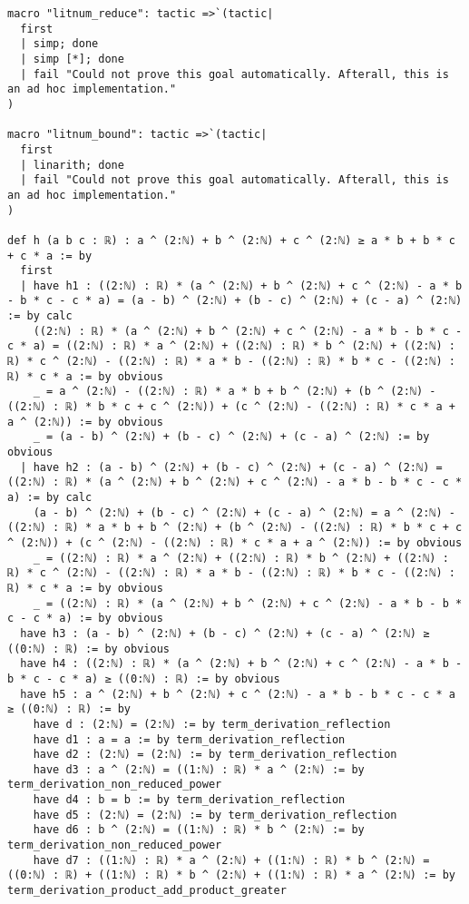 \documentclass{article}
\begin{document}
\begin{tcolorbox}[colback=white!10, width=\linewidth]
\begin{lstlisting}[language=Lean4]
macro "litnum_reduce": tactic =>`(tactic|
  first
  | simp; done
  | simp [*]; done
  | fail "Could not prove this goal automatically. Afterall, this is an ad hoc implementation."
)

macro "litnum_bound": tactic =>`(tactic|
  first
  | linarith; done
  | fail "Could not prove this goal automatically. Afterall, this is an ad hoc implementation."
)

def h (a b c : ℝ) : a ^ (2:ℕ) + b ^ (2:ℕ) + c ^ (2:ℕ) ≥ a * b + b * c + c * a := by
  first
  | have h1 : ((2:ℕ) : ℝ) * (a ^ (2:ℕ) + b ^ (2:ℕ) + c ^ (2:ℕ) - a * b - b * c - c * a) = (a - b) ^ (2:ℕ) + (b - c) ^ (2:ℕ) + (c - a) ^ (2:ℕ) := by calc
    ((2:ℕ) : ℝ) * (a ^ (2:ℕ) + b ^ (2:ℕ) + c ^ (2:ℕ) - a * b - b * c - c * a) = ((2:ℕ) : ℝ) * a ^ (2:ℕ) + ((2:ℕ) : ℝ) * b ^ (2:ℕ) + ((2:ℕ) : ℝ) * c ^ (2:ℕ) - ((2:ℕ) : ℝ) * a * b - ((2:ℕ) : ℝ) * b * c - ((2:ℕ) : ℝ) * c * a := by obvious
    _ = a ^ (2:ℕ) - ((2:ℕ) : ℝ) * a * b + b ^ (2:ℕ) + (b ^ (2:ℕ) - ((2:ℕ) : ℝ) * b * c + c ^ (2:ℕ)) + (c ^ (2:ℕ) - ((2:ℕ) : ℝ) * c * a + a ^ (2:ℕ)) := by obvious
    _ = (a - b) ^ (2:ℕ) + (b - c) ^ (2:ℕ) + (c - a) ^ (2:ℕ) := by obvious
  | have h2 : (a - b) ^ (2:ℕ) + (b - c) ^ (2:ℕ) + (c - a) ^ (2:ℕ) = ((2:ℕ) : ℝ) * (a ^ (2:ℕ) + b ^ (2:ℕ) + c ^ (2:ℕ) - a * b - b * c - c * a) := by calc
    (a - b) ^ (2:ℕ) + (b - c) ^ (2:ℕ) + (c - a) ^ (2:ℕ) = a ^ (2:ℕ) - ((2:ℕ) : ℝ) * a * b + b ^ (2:ℕ) + (b ^ (2:ℕ) - ((2:ℕ) : ℝ) * b * c + c ^ (2:ℕ)) + (c ^ (2:ℕ) - ((2:ℕ) : ℝ) * c * a + a ^ (2:ℕ)) := by obvious
    _ = ((2:ℕ) : ℝ) * a ^ (2:ℕ) + ((2:ℕ) : ℝ) * b ^ (2:ℕ) + ((2:ℕ) : ℝ) * c ^ (2:ℕ) - ((2:ℕ) : ℝ) * a * b - ((2:ℕ) : ℝ) * b * c - ((2:ℕ) : ℝ) * c * a := by obvious
    _ = ((2:ℕ) : ℝ) * (a ^ (2:ℕ) + b ^ (2:ℕ) + c ^ (2:ℕ) - a * b - b * c - c * a) := by obvious
  have h3 : (a - b) ^ (2:ℕ) + (b - c) ^ (2:ℕ) + (c - a) ^ (2:ℕ) ≥ ((0:ℕ) : ℝ) := by obvious
  have h4 : ((2:ℕ) : ℝ) * (a ^ (2:ℕ) + b ^ (2:ℕ) + c ^ (2:ℕ) - a * b - b * c - c * a) ≥ ((0:ℕ) : ℝ) := by obvious
  have h5 : a ^ (2:ℕ) + b ^ (2:ℕ) + c ^ (2:ℕ) - a * b - b * c - c * a ≥ ((0:ℕ) : ℝ) := by
    have d : (2:ℕ) = (2:ℕ) := by term_derivation_reflection
    have d1 : a = a := by term_derivation_reflection
    have d2 : (2:ℕ) = (2:ℕ) := by term_derivation_reflection
    have d3 : a ^ (2:ℕ) = ((1:ℕ) : ℝ) * a ^ (2:ℕ) := by term_derivation_non_reduced_power
    have d4 : b = b := by term_derivation_reflection
    have d5 : (2:ℕ) = (2:ℕ) := by term_derivation_reflection
    have d6 : b ^ (2:ℕ) = ((1:ℕ) : ℝ) * b ^ (2:ℕ) := by term_derivation_non_reduced_power
    have d7 : ((1:ℕ) : ℝ) * a ^ (2:ℕ) + ((1:ℕ) : ℝ) * b ^ (2:ℕ) = ((0:ℕ) : ℝ) + ((1:ℕ) : ℝ) * b ^ (2:ℕ) + ((1:ℕ) : ℝ) * a ^ (2:ℕ) := by term_derivation_product_add_product_greater

\end{lstlisting}
\end{tcolorbox}
\end{document}
